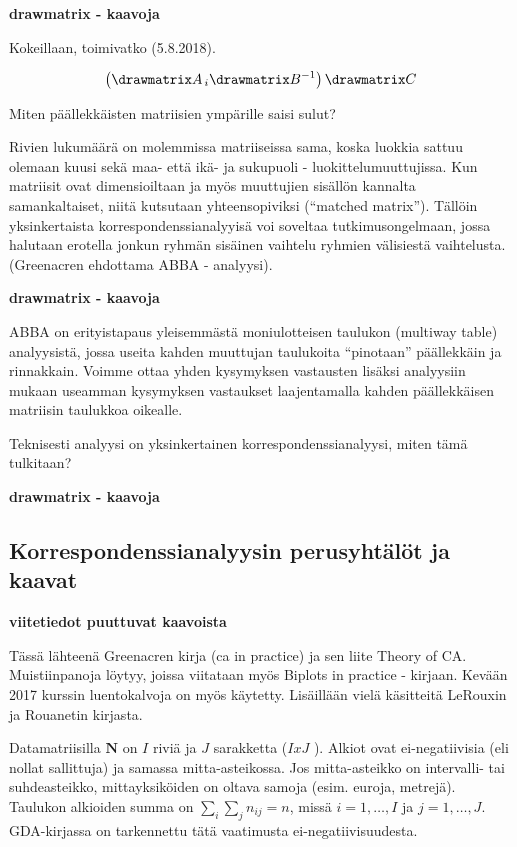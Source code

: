 \documentclass[finnish,]{article}
\begin{document}
\textbf{drawmatrix - kaavoja}

Kokeillaan, toimivatko (5.8.2018).

\begin{equation}
\left(
\drawmatrix A_{\hspace{0.5 mm}\vspace{0.5 mm}i}
\drawmatrix B^{-1}
\right)
\drawmatrix C
\end{equation}

Miten päällekkäisten matriisien ympärille saisi sulut?

Rivien lukumäärä on molemmissa matriiseissa sama, koska luokkia sattuu
olemaan kuusi sekä maa- että ikä- ja sukupuoli - luokittelumuuttujissa.
Kun matriisit ovat dimensioiltaan ja myös muuttujien sisällön kannalta
samankaltaiset, niitä kutsutaan yhteensopiviksi (``matched matrix'').
Tällöin yksinkertaista korrespondenssianalyyisä voi soveltaa
tutkimusongelmaan, jossa halutaan erotella jonkun ryhmän sisäinen
vaihtelu ryhmien välisiestä vaihtelusta. (Greenacren ehdottama ABBA -
analyysi).

\textbf{drawmatrix - kaavoja}

ABBA on erityistapaus yleisemmästä moniulotteisen taulukon (multiway
table) analyysistä, jossa useita kahden muuttujan taulukoita
``pinotaan'' päällekkäin ja rinnakkain. Voimme ottaa yhden kysymyksen
vastausten lisäksi analyysiin mukaan useamman kysymyksen vastaukset
laajentamalla kahden päällekkäisen matriisin taulukkoa oikealle.

Teknisesti analyysi on yksinkertainen korrespondenssianalyysi, miten
tämä tulkitaan?

\textbf{drawmatrix - kaavoja}

\hypertarget{korrespondenssianalyysin-perusyhtalot-ja-kaavat}{%
\subsection{Korrespondenssianalyysin perusyhtälöt ja
kaavat}\label{korrespondenssianalyysin-perusyhtalot-ja-kaavat}}

\textbf{viitetiedot puuttuvat kaavoista}

Tässä lähteenä Greenacren kirja (ca in practice) ja sen liite Theory of
CA. Muistiinpanoja löytyy, joissa viitataan myös Biplots in practice -
kirjaan. Kevään 2017 kurssin luentokalvoja on myös käytetty. Lisäillään
vielä käsitteitä LeRouxin ja Rouanetin kirjasta.

Datamatriisilla \(\boldsymbol{N}\) on \(I\) riviä ja \(J\) sarakketta
(\(I x J\) ). Alkiot ovat ei-negatiivisia (eli nollat sallittuja) ja
samassa mitta-asteikossa. Jos mitta-asteikko on intervalli- tai
suhdeasteikko, mittayksiköiden on oltava samoja (esim. euroja, metrejä).
Taulukon alkioiden summa on \(\sum_{i} \sum_{j}n_{ij} = n\), missä
\(i = 1, \dots , I\) ja \(j = 1, \dots , J\). GDA-kirjassa on
tarkennettu tätä vaatimusta ei-negatiivisuudesta.
\end{document}
